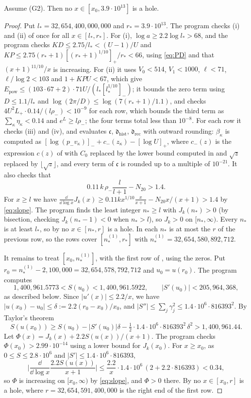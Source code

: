 \documentclass[11pt,colorlinks]{charlie}
\newcommand{\xo}{x_0}
\begin{document}
\begin{proposition}\label{prop:twenty}
Assume (G2). Then no $x\in[\xo,3.9\cdot10^{13}]$ is a hole.
\end{proposition}
\begin{proof}
Put $l_*=32{,}654{,}400{,}000{,}000$ and $r_*=3.9\cdot10^{13}$. The program checks (i) and (ii) of  once for all $x\in[l_*,r_*]$. For (i), $\log a\ge2.2\log l_*>68$, and the program checks $KD\le2.75/l_*<(U-1)/U$ and $KP\le2.75(r_*+1)[(r_*+1)^{1/10}]_+/r_*<66$, using \eqref{eq:PD} and that $(x+1)^{11/10}/x$ is increasing. For (ii) it uses $V_0<514$, $V_1<1000$, $\ell<71$, $\ell/\log2<103$ and $1+KPU<67$, which give $E_{\mathrm{pow}}\le(103\cdot67+2)\cdot71U/(l_*[l_*^{1/10}]_-)$; it bounds the zero term using $D\le1.1/l_*$ and $\log(2\pi/D)\le\log(7(r_*+1)/1.1)$, and checks $4U^2L_+\cdot0.14/(l\rho_-)<10^{-9}$ for each row, which bounds the third term as $\sum_\kappa\eta_\kappa<0.14$ and $e^L\ge l\rho_-$; the four terms total less than $10^{-8}$. For each row it checks (iii) and (iv), and evaluates $\mathfrak c$, $\mathfrak d_{\mathrm{hist}}$, $\mathfrak d_{\mathrm{rec}}$ with outward rounding: $\beta_\kappa$ is computed as $[\log(p_-v_\kappa)]_-+c_-(z_\kappa)-[\log U]_+$, where $c_-(z)$ is the expression $c(z)$ of  with $C_0$ replaced by the lower bound computed in  and $\sqrt z$ replaced by $\lfloor\sqrt z\rfloor$, and every term of $\mathfrak c$ is rounded up to a multiple of $10^{-21}$. It also checks that
\begin{equation}\label{eq:slope}
 0.11\,k\,\rho_-\frac l{l+1}-N_{20}>1.4 .
\end{equation}
For $x\ge l$ we have $\frac{\dd}{\dd\log x}J_k(x)\ge0.11kx^{1/10}\frac x{x+1}-N_{20}x/(x+1)>1.4$ by \eqref{eq:slope}. The program finds the least integer $n_*\ge l$ with $J_k(n_*)>0$ (by bisection, checking $J_k(n_*-1)<0$ when $n_*>l$), so $J_k>0$ on $[n_*,\infty)$. Every $n_*$ is at least $l_*$, so by  no $x\in[n_*,r]$ is a hole. In  each $n_*$ is at most the $r$ of the previous row, so the rows cover $[n_*^{(1)},r_*]$ with $n_*^{(1)}=32{,}654{,}580{,}892{,}712$.

It remains to treat $[\xo,n_*^{(1)}]$, with the first row of , using the zeros. Put $r_0=n_*^{(1)}-2{,}100{,}000=32{,}654{,}578{,}792{,}712$ and $u_0=u(r_0)$. The program computes
\[
 1{,}400{,}961.5773<S(u_0)<1{,}400{,}961.5922,\qquad|S'(u_0)|<205{,}964{,}368,
\]
as described below. Since $|u'(x)|\le2.2/x$, we have $|u(\xo)-u_0|\le\delta:=2.2(r_0-\xo)/\xo$, and $|S''|\le\sum_j\gamma_j^2\le1.4\cdot10^6\cdot816393^2$. By Taylor's theorem
\[
 S(u(\xo))\ge S(u_0)-|S'(u_0)|\delta-\tfrac12\cdot1.4\cdot10^6\cdot816393^2\,\delta^2>1{,}400{,}961.44 .
\]
Let $\Phi(x)=J_k(x)+2.2S(u(x))/(x+1)$. The program checks $\Phi(\xo)>2.99\cdot10^{-14}$ using a lower bound for $J_k(\xo)$. For $x\ge\xo$, as $0\le S\le2.8\cdot10^6$ and $|S'|\le1.4\cdot10^6\cdot816393$,
\[
 \Big|\frac{\dd}{\dd\log x}\frac{2.2S(u(x))}{x+1}\Big|\le\frac{2.2}{x}\cdot1.4\cdot10^6\,(2+2.2\cdot816393)<0.34,
\]
so $\Phi$ is increasing on $[\xo,\infty)$ by \eqref{eq:slope}, and $\Phi>0$ there. By  no $x\in[\xo,r]$ is a hole, where $r=32{,}654{,}591{,}400{,}000$ is the right end of the first row.


\end{proof}
\end{document}
